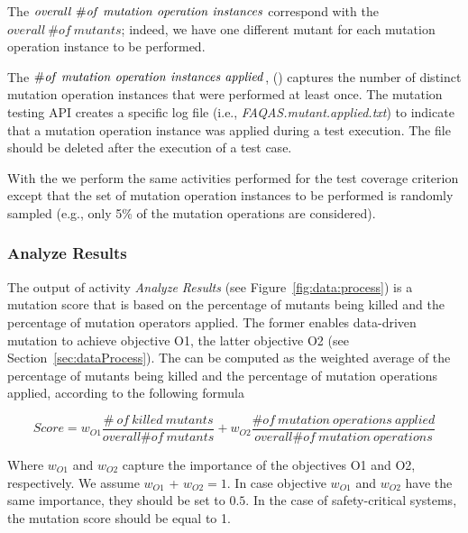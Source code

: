 The $\mathit{overall}\ \# \mathit{of}\ \mathit{mutation} \ \mathit{operation} \ \mathit{instances}$ correspond with the $\mathit{overall}\ \# \mathit{of}\ \mathit{mutants}$; indeed, we have one different mutant for each mutation operation instance to be performed. 

The $\# \mathit{of}\ \mathit{mutation} \ \mathit{operation}\ \mathit{instances} \ \mathit{applied}$, () captures the number of distinct mutation operation instances that were performed at least once. The mutation testing API creates a specific log file (i.e., \emph{FAQAS.mutant.applied.txt}) to indicate that a mutation operation instance was applied during a test execution. The file should be deleted after the execution of a test case.

With the  we perform the same activities performed for the test coverage criterion except that the set of mutation operation instances to be performed is randomly sampled (e.g., only 5\% of the mutation operations are considered).

\subsubsection{Analyze Results}
\label{sec:analyzeResults}

The output  of activity \emph{Analyze Results} (see Figure~\ref{fig:data:process}) is a mutation score that is based on
the percentage of mutants being killed and the percentage of mutation operators applied. 
The former enables data-driven mutation to achieve objective O1, the latter objective O2 (see Section~\ref{sec:dataProcess}). 
The  can be computed as the weighted average of the percentage of mutants being killed and the percentage of mutation operations applied, according to the following formula

\begin{equation}
Score=w_{O1} \frac{\# \ \mathit{of}\ \mathit{killed} \ \mathit{mutants}}{\mathit{overall} \# \mathit{of}\ \mathit{mutants}} + w_{O2} \frac{\# \mathit{of}\ \mathit{mutation} \ \mathit{operations} \ \mathit{applied}}{\mathit{overall} \# \mathit{of}\ \mathit{mutation} \ \mathit{operations}}
\label{f:mutation:score}
\end{equation}

Where $w_{O1}$ and $w_{O2}$ capture the importance of the objectives O1 and O2, respectively. We assume $w_{O1}$ + $w_{O2} = 1$. In case objective $w_{O1}$ and $w_{O2}$ have the same importance, they should be set to $0.5$. In the case of safety-critical systems, the mutation score should be equal to 1.





